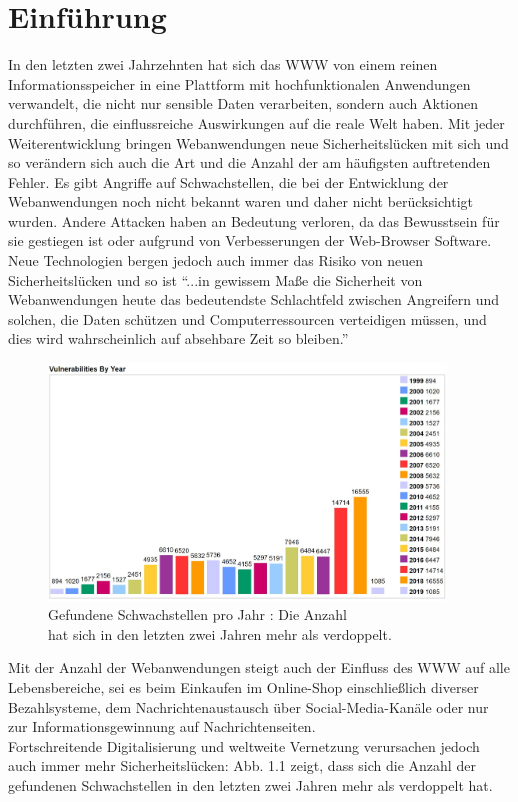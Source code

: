 \documentclass[12pt,oneside,a4paper,parskip,pointlessnumbers]{scrbook}
\begin{document}
\chapter{Einführung}\label{ch:intro}
In den letzten zwei Jahrzehnten hat sich das \ac{WWW} von einem reinen Informationsspeicher in eine Plattform mit hochfunktionalen Anwendungen verwandelt, die nicht nur sensible Daten verarbeiten, sondern auch  Aktionen durchführen, die einflussreiche Auswirkungen auf die reale Welt haben.
Mit jeder Weiterentwicklung bringen Webanwendungen neue Sicherheitslücken mit sich und so verändern sich auch die Art und die Anzahl der am häufigsten auftretenden Fehler. Es gibt Angriffe auf Schwachstellen, die bei der Entwicklung der Webanwendungen noch nicht bekannt waren und daher nicht berücksichtigt wurden. Andere Attacken haben an Bedeutung verloren, da das Bewusstsein für sie gestiegen ist oder aufgrund von Verbesserungen der Web-Browser Software. Neue Technologien bergen jedoch auch immer das Risiko von neuen Sicherheitslücken und so ist ``...in gewissem Maße die Sicherheit von Webanwendungen heute das bedeutendste Schlachtfeld zwischen Angreifern und solchen, die Daten schützen und Computerressourcen verteidigen müssen, und dies wird wahrscheinlich auf absehbare Zeit so bleiben.'' \cite[S.6]{handbook}
\begin{figure}[H]
  \centering
    \includegraphics[width=0.94\textwidth]{Images/VulnByYear}
    \caption[Gefundene Schwachstellen pro Jahr]{Gefundene Schwachstellen pro Jahr \cite{cve}: Die Anzahl\\ hat
     sich in den letzten zwei Jahren mehr als verdoppelt.}
\end{figure}
Mit der Anzahl der Webanwendungen steigt auch der Einfluss des WWW auf alle Lebensbereiche, sei es beim Einkaufen im Online-Shop einschließlich diverser Bezahlsysteme, dem Nachrichtenaustausch über Social-Media-Kanäle oder nur zur Informationsgewinnung auf Nachrichtenseiten.\\
Fortschreitende Digitalisierung und weltweite Vernetzung verursachen jedoch auch immer mehr Sicherheitslücken: Abb. 1.1 zeigt, dass sich die Anzahl der gefundenen Schwachstellen in den letzten zwei Jahren mehr als verdoppelt hat.
\end{document}
